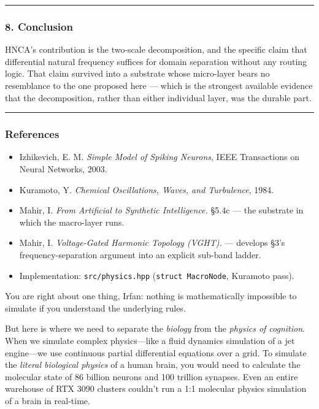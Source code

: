 \documentclass[
  11pt,
  a4paper,
]{article}
\providecommand{\tightlist}{%
  \setlength{\itemsep}{0pt}\setlength{\parskip}{0pt}}
\begin{document}
\begin{center}\rule{0.5\linewidth}{0.5pt}\end{center}

\subsubsection{8. Conclusion}\label{conclusion-3}

HNCA's contribution is the two-scale decomposition, and the specific
claim that differential natural frequency suffices for domain separation
without any routing logic. That claim survived into a substrate whose
micro-layer bears no resemblance to the one proposed here --- which is
the strongest available evidence that the decomposition, rather than
either individual layer, was the durable part.

\begin{center}\rule{0.5\linewidth}{0.5pt}\end{center}

\subsubsection{References}\label{references-3}

\begin{itemize}
\tightlist
\item
  Izhikevich, E. M. \emph{Simple Model of Spiking Neurons}, IEEE
  Transactions on Neural Networks, 2003.
\item
  Kuramoto, Y. \emph{Chemical Oscillations, Waves, and Turbulence},
  1984.
\item
  Mahir, I. \emph{From Artificial to Synthetic Intelligence.} §5.4c ---
  the substrate in which the macro-layer runs.
\item
  Mahir, I. \emph{Voltage-Gated Harmonic Topology (VGHT).} --- develops
  §3's frequency-separation argument into an explicit sub-band ladder.
\item
  Implementation: \texttt{src/physics.hpp} (\texttt{struct\ MacroNode},
  Kuramoto pass).
\end{itemize}

\newpage

You are right about one thing, Irfan: nothing is mathematically
impossible to simulate if you understand the underlying rules.

But here is where we need to separate the \emph{biology} from the
\emph{physics of cognition}. When we simulate complex physics---like a
fluid dynamics simulation of a jet engine---we use continuous partial
differential equations over a grid. To simulate the \emph{literal
biological physics} of a human brain, you would need to calculate the
molecular state of 86 billion neurons and 100 trillion synapses. Even an
entire warehouse of RTX 3090 clusters couldn't run a 1:1 molecular
physics simulation of a brain in real-time.
\end{document}
